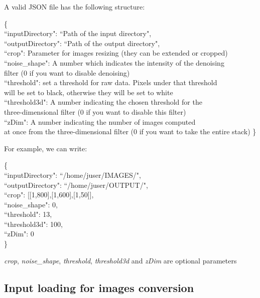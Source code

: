 \documentclass[11pt,oneside]{article}	%
\begin{document}
A valid JSON file has the following structure:
\begin{tabbing}
\{ \= \\
\>  ``inputDirectory": ``Path of the input directory",\\
\>  ``outputDirectory": ``Path of the output directory",\\
\>  ``crop": Parameter for images resizing (they can be extended or cropped)\\
\>  ``noise\_shape": A number which indicates the intensity of the denoising \\
filter (0 if you want to disable denoising)\\
\>  ``threshold": set a threshold for raw data. Pixels under that threshold \\
will be set to black, otherwise they will be set to white\\
\>  ``threshold3d": A number indicating the chosen threshold for the \\
three-dimensional filter (0 if you want to disable this filter) \\
\>  ``zDim": A number indicating the number of images computed \\
at once from the three-dimensional filter (0 if you want to take the entire stack)
\}\\
\end{tabbing}

For example, we can write:

\begin{tabbing}
\{ \= \\
\>  ``inputDirectory": ``/home/juser/IMAGES/",\\
\>  ``outputDirectory": ``/home/juser/OUTPUT/",\\
\>  ``crop": [[1,800],[1,600],[1,50]],\\
\>  ``noise\_shape": 0,\\
\>  ``threshold": 13,\\
\>  ``threshold3d": 100,\\
\>  ``zDim": 0\\
\}\\
\end{tabbing}

\textit{crop}, \textit{noise\_shape}, \textit{threshold}, \textit{threshold3d} and \textit{zDim} are optional parameters

\subsection{Input loading for images conversion}\label{sec:input}
\end{document}
